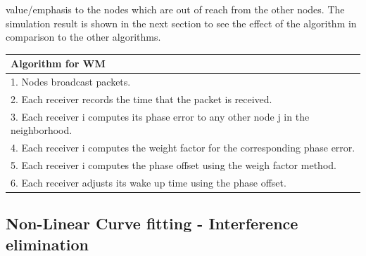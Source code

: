 \documentclass[a4paper,10pt]{report}
\begin{document}
value/emphasis to the nodes which are out of reach from the other
nodes. The simulation result is shown in the next section to see the
effect of the algorithm in comparison to the other
algorithms.\newline \newline
\begin{tabular}{  l }Algorithm for WM \\\hline
1. Nodes broadcast packets. \\  2. Each receiver records the time that the packet is received. \\
3. Each receiver i computes its phase error to any other node j in the neighborhood. \\
4. Each receiver i computes the weight factor for the corresponding phase error. \\
5. Each receiver i computes the phase offset using the weigh factor method. \\
6. Each receiver adjusts its wake up time using the phase offset.\\
\hline
\end{tabular}
\subsection{\textbf{Non-Linear Curve fitting - Interference
elimination}}
\end{document}
